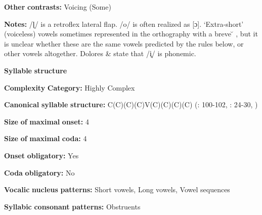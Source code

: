 \begin{styleBody}
\textbf{Other} \textbf{contrasts:} Voicing (Some)
\end{styleBody}

\begin{styleBody}
\textbf{Notes:} /ɭ/ is a retroflex lateral flap. /o/ is often realized as [ɔ]. ‘Extra-short’ (voiceless) vowels sometimes represented in the orthography with a breve  \u{} , but it is unclear whether these are the same vowels predicted by the rules below, or other vowels altogether. Dolores \& \citet[236]{Mathiot1991} state that /i̥/ is phonemic.
\end{styleBody}

\begin{styleBody}
\textbf{Syllable} \textbf{structure}
\end{styleBody}

\begin{styleBody}
\textbf{Complexity} \textbf{Category:} Highly Complex
\end{styleBody}

\begin{styleBody}
\textbf{Canonical} \textbf{syllable} \textbf{structure:} C(C)(C)(C)V(C)(C)(C)(C) (\citealt{Saxton1982}: 100-102, \citealt{Hale1959}: 24-30, \citealt{HillZepeda1992})
\end{styleBody}

\begin{styleBody}
\textbf{Size} \textbf{of} \textbf{maximal} \textbf{onset:} 4
\end{styleBody}

\begin{styleBody}
\textbf{Size} \textbf{of} \textbf{maximal} \textbf{coda:} 4
\end{styleBody}

\begin{styleBody}
\textbf{Onset} \textbf{obligatory:} Yes
\end{styleBody}

\begin{styleBody}
\textbf{Coda} \textbf{obligatory:} No
\end{styleBody}

\begin{styleBody}
\textbf{Vocalic} \textbf{nucleus} \textbf{patterns:} Short vowels, Long vowels, Vowel sequences
\end{styleBody}

\begin{styleBody}
\textbf{Syllabic} \textbf{consonant} \textbf{patterns:} Obstruents
\end{styleBody}

